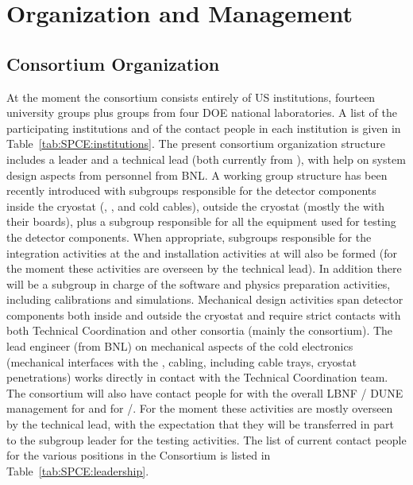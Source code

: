 \section{Organization and Management}
\label{sec:fdsp-tpcelec-management}

\subsection{Consortium Organization}
\label{sec:fdsp-tpcelec-management-consort}

At the moment the  consortium consists entirely of
US institutions, fourteen university groups plus groups from four
DOE national laboratories. A list of the participating institutions
and of the contact people in each institution is given in
Table~\ref{tab:SPCE:institutions}. The present consortium organization
structure includes a leader and a technical lead (both currently
from \fnal), with help on system design aspects from personnel
from BNL. A working group structure has been recently 
introduced with subgroups responsible for the detector 
components inside the cryostat (, , and
cold cables), outside the cryostat (mostly the  with 
their boards), plus a subgroup responsible for all the equipment
used for testing the detector components. When appropriate, subgroups
responsible for the integration activities at the  and
installation activities at \surf will also be formed (for the moment 
these activities are overseen by the technical lead). In addition
there will be a subgroup in charge of the software and physics
preparation activities, including calibrations and simulations.
Mechanical design activities span detector components both inside
and outside the cryostat and require strict contacts with both
Technical Coordination and other consortia (mainly the 
consortium). The lead engineer (from BNL) on mechanical aspects of the cold
electronics (mechanical interfaces with the , cabling, including 
cable trays, cryostat penetrations) works directly in contact with
the Technical Coordination team. The consortium will also have 
contact people for with the overall LBNF / DUNE management for
 and for /. For the moment these activities are mostly
overseen by the technical lead, with the expectation that they
will be transferred in part to the subgroup leader for the testing
activities. The list of current contact people for the various 
positions in the Consortium is listed in Table~\ref{tab:SPCE:leadership}.

